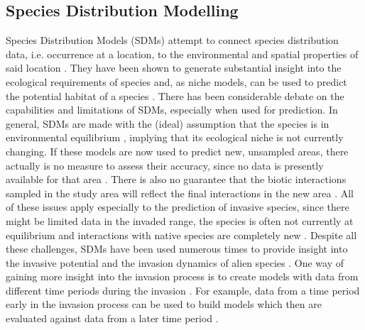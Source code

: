 \documentclass[12pt,a4paper]{article}
\begin{document}
\subsection{Species Distribution Modelling}
Species Distribution Models (SDMs) attempt to connect species distribution data, i.e. occurrence at a location, to the environmental and spatial properties of said location \cite{elith2009sdmtheory}.
They have been shown to generate substantial insight into the ecological requirements of species and, as niche models, can be used to predict the potential habitat of a species \cite{araujo2006sdmchallenges}.
There has been considerable debate on the capabilities and limitations of SDMs, especially when used for prediction.
In general, SDMs are made with the (ideal) assumption that the species is in environmental equilibrium \cite{elith2009sdmtheory}, implying that its ecological niche is not currently changing.
If these models are now used to predict new, unsampled areas, there actually is no measure to assess their accuracy, since no data is presently available for that area \cite{araujo2006sdmchallenges}.
There is also no guarantee that the biotic interactions sampled in the study area will reflect the final interactions in the new area \cite{elith2009sdmtheory}.
All of these issues apply especially to the prediction of invasive species, since there might be limited data in the invaded range, the species is often not currently at equilibrium and interactions with native species are completely new \cite{mainali2015sdmprojecting}.
Despite all these challenges, SDMs have been used numerous times to provide insight into the invasive potential and the invasion dynamics of alien species \cite{zimmermann2010sdmtrends}.
One way of gaining more insight into the invasion process is to create models with data from different time periods during the invasion \cite{briscoe2019palmerisdm}.
For example, data from a time period early in the invasion process can be used to build models which then are evaluated against data from a later time period \cite{barbet2018nigrithoraxsdm}.
\end{document}
